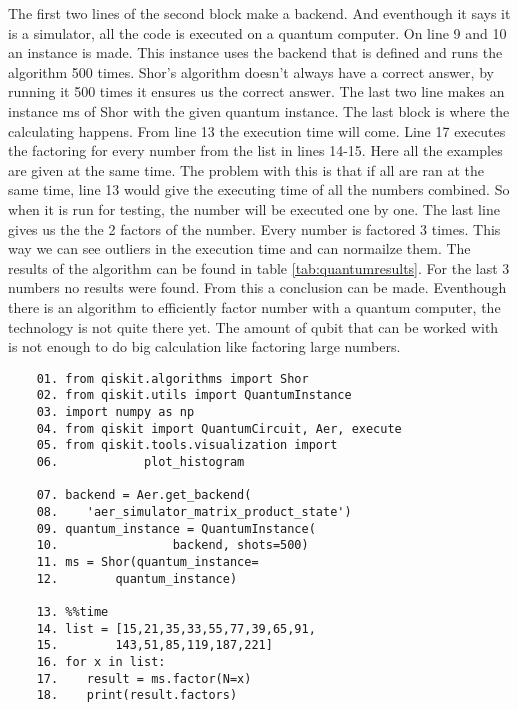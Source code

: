 The first two lines of the second block make a backend. And eventhough it says it is a simulator, all the code is executed on a quantum computer.
On line 9 and 10 an instance is made. This instance uses the backend that is defined and runs the algorithm 500 times. Shor's algorithm doesn't always have a correct answer, by running it 500 times it ensures us the correct answer.
The last two line makes an instance ms of Shor with the given quantum instance.
The last block is where the calculating happens.
From line 13 the execution time will come.
Line 17 executes the factoring for every number from the list in lines 14-15. Here all the examples are given at the same time. The problem with this is that if all are ran at the same time, line 13 would give the executing time of all the numbers combined.
So when it is run for testing, the number will be executed one by one.
The last line gives us the the 2 factors of the number.
Every number is factored 3 times. This way we can see outliers in the execution time and can normailze them.
The results of the algorithm can be found in table \ref{tab:quantumresults}. For the last 3 numbers no results were found. 
From this a conclusion can be made. Eventhough there is an algorithm to efficiently factor number with a quantum computer, the technology is not quite there yet.
The amount of qubit that can be worked with is not enough to do big calculation like factoring large numbers.

\begin{lstlisting}
    01. from qiskit.algorithms import Shor
    02. from qiskit.utils import QuantumInstance
    03. import numpy as np
    04. from qiskit import QuantumCircuit, Aer, execute
    05. from qiskit.tools.visualization import
    06.            plot_histogram

    07. backend = Aer.get_backend(
    08.    'aer_simulator_matrix_product_state')
    09. quantum_instance = QuantumInstance(
    10.                backend, shots=500)
    11. ms = Shor(quantum_instance=
    12.        quantum_instance)

    13. %%time
    14. list = [15,21,35,33,55,77,39,65,91,
    15.        143,51,85,119,187,221]
    16. for x in list:
    17.    result = ms.factor(N=x)
    18.    print(result.factors)
\end{lstlisting}

